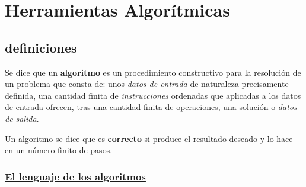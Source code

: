 \documentclass[twoside]{report}
\begin{document}
\section{Herramientas Algorítmicas}

\subsection{definiciones}

\begin{defi}
Se dice que un \textbf{algoritmo} es un procedimiento constructivo para la resolución de un problema que consta de: unos \emph{datos de entrada} de naturaleza precisamente definida, una cantidad finita de \emph{instrucciones} ordenadas que aplicadas a los datos de entrada ofrecen, tras una cantidad finita de operaciones, una solución o \emph{datos de salida}.
\end{defi}

\begin{defi}
Un algoritmo se dice que es \textbf{correcto} si produce el resultado deseado y lo hace en un número finito de pasos.
\end{defi}


\subsubsection{\underline{El lenguaje de los algoritmos}}
\end{document}
